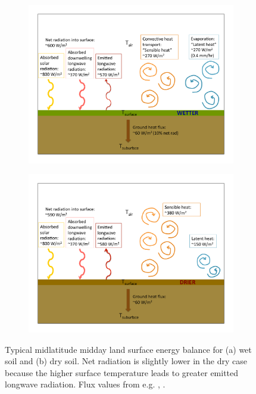 \begin{figure}
\begin{subfigure}{0.7\textwidth}
\includegraphics[width=\textwidth]{ch0-introduction/energy_balance_wet.pdf}
\caption{}
\end{subfigure}
\begin{subfigure}{0.7\textwidth}
\includegraphics[width=\textwidth]{ch0-introduction/energy_balance_dry.pdf}
\caption{}
\end{subfigure}
\caption{Typical midlatitude midday land surface energy balance for (a) wet soil and (b) dry soil.  Net radiation is slightly lower in the dry case because the higher surface temperature leads to greater emitted longwave radiation.  Flux values from e.g. \cite{bonan}, \cite{teuling2010contrasting}.}
\label{fig:intro_enbal}
\end{figure}

